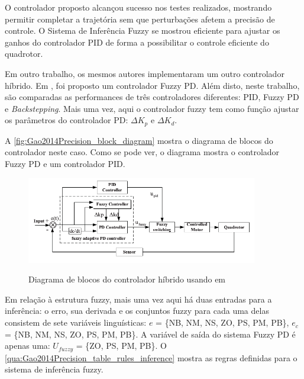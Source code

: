 





O controlador proposto alcançou sucesso nos testes realizados, mostrando permitir completar a trajetória sem que perturbações afetem a precisão de controle. O Sistema de Inferência Fuzzy se mostrou eficiente para ajustar os ganhos do controlador PID de forma a possibilitar o controle eficiente do quadrotor.

Em outro trabalho, os mesmos autores implementaram um outro controlador híbrido. Em \cite{Gao2014Precision}, foi proposto um controlador Fuzzy PD. Além disto, neste trabalho, são comparadas as performances de três controladores diferentes: PID, Fuzzy PD e \textit{Backstepping}. Mais uma vez, aqui o controlador fuzzy tem como função ajustar os parâmetros do controlador PD: $\Delta K_p$ e $\Delta K_d$.

A \autoref{fig:Gao2014Precision_block_diagram} mostra o diagrama de blocos do controlador neste caso. Como se pode ver, o diagrama mostra o controlador Fuzzy PD e um controlador PID.

\begin{figure}[!htb]
    \centering
    \caption{Diagrama de blocos do controlador híbrido usando em \cite{Gao2014Precision}}
    \includegraphics[width=0.9\textwidth]{./04-figuras/Gao2014Precision_block_diagram}
    \label{fig:Gao2014Precision_block_diagram}
\end{figure}

Em relação à estrutura fuzzy, mais uma vez aqui há duas entradas para a inferência: o erro, sua derivada e os conjuntos fuzzy para cada uma delas consistem de sete variáveis linguísticas: $e$ = \{NB, NM, NS, ZO, PS, PM, PB\}, $e_c$ = \{NB, NM, NS, ZO, PS, PM, PB\}. A variável de saída do sistema Fuzzy PD é apenas uma: $U_{fuzzy}$ = \{ZO, PS, PM, PB\}. O \autoref{qua:Gao2014Precision_table_rules_inference} mostra as regras definidas para o sistema de inferência fuzzy.

